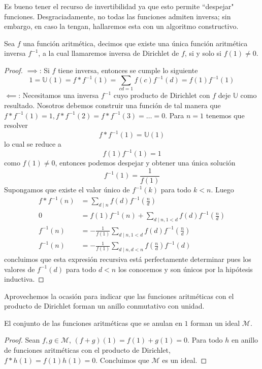 \documentclass[main.tex]{subfiles}
\begin{document}
Es bueno tener el recurso de invertibilidad ya que esto permite ``despejar" funciones. Desgraciadamente, no todas las funciones admiten inversa; sin embargo, en caso la tengan, hallaremos esta con un algoritmo constructivo.
\begin{theorem}
Sea $f$ una funci\'on aritm\'etica, decimos que existe una \'unica funci\'on aritm\'etica inversa $f^{-1}$, a la cual llamaremos inversa de Dirichlet de $f$, si y solo si $f(1)\not=0$.
\end{theorem}
\begin{proof}
$\implies$: Si $f$ tiene inversa, entonces se cumple lo siguiente
$$1 = \mathbb U(1) = f * f^{-1}(1) = \sum_{cd = 1} f(c)f^{-1}(d) = f(1)f^{-1}(1)$$
$\impliedby$: Necesitamos una inversa $f^{-1}$ cuyo producto de Dirichlet con $f$ deje $\mathbb U$ como resultado. Nosotros debemos construir una funci\'on de tal manera que $f*f^{-1}(1) = 1, f*f^{-1}(2) = f*f^{-1}(3) = \dots = 0$. Para $n = 1$ tenemos que resolver
$$f*f^{-1}(1) = \mathbb U(1)$$
lo cual se reduce a
$$f(1)f^{-1}(1) = 1$$
como $f(1) \not= 0$, entonces podemos despejar y obtener una \'unica soluci\'on
$$f^{-1}(1) = \frac{1}{f(1)}$$
Supongamos que existe el valor \'unico de $f^{-1}(k)$ para todo $k < n$. Luego
\begin{align*}
    f*f^{-1}(n) &= \sum_{d \mid n} f(d)f^{-1}(\frac{n}{d})\\
    0 &= f(1)f^{-1}(n) + \sum_{d \mid n, 1 < d} f(d)f^{-1}(\frac{n}{d})\\
    f^{-1}(n) &= -\frac{1}{f(1)}\sum_{d \mid n, 1 < d} f(d)f^{-1}(\frac{n}{d})\\
    f^{-1}(n) &= -\frac{1}{f(1)}\sum_{d \mid n, d < n}f(\frac{n}{d})f^{-1}(d)
\end{align*}
concluimos que esta expresi\'on recursiva est\'a perfectamente determinar pues los valores de $f^{-1}(d)$ para todo $d < n$ los conocemos y son \'unicos por la hip\'otesis inductiva.
\end{proof}
Aprovechemos la ocasi\'on para indicar que las funciones aritm\'eticas con el producto de Dirichlet forman un anillo conmutativo con unidad.
\begin{theorem}
El conjunto de las funciones aritm\'eticas que se anulan en $1$ forman un ideal $\mathcal{M}$.
\end{theorem}
\begin{proof}
Sean $f, g \in \mathcal{M}$, $(f + g)(1) = f(1) + g(1) = 0$. Para todo $h$ en anillo de funciones aritm\'eticas con el producto de Dirichlet, $f * h(1) = f(1)h(1) = 0$. Concluimos que $\mathcal{M}$ es un ideal.
\end{proof}
\end{document}
